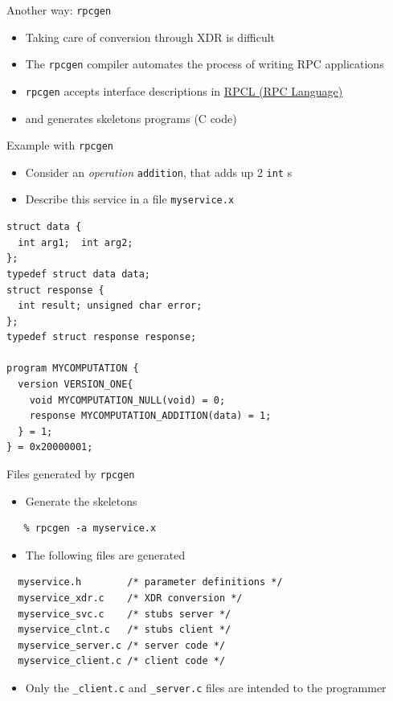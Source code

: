 \documentclass[bigger,hyperref={colorlinks=true, urlcolor=red, plainpages=false, pdfpagelabels, bookmarksnumbered}]{beamer}
\begin{document}
\begin{frame}[fragile,label=sec-2-15]{Another way: \texttt{rpcgen}}
 \begin{itemize}
\item Taking care of conversion through XDR is difficult
\item The \texttt{rpcgen} compiler automates the process of writing RPC applications
\item \texttt{rpcgen} accepts interface descriptions in \href{http://docs.oracle.com/cd/E19683-01/816-1435/6m7rrfn9k/index.html}{RPCL (RPC Language)}
\item and generates skeletons programs (C code)
\end{itemize}
\end{frame}

\begin{frame}[fragile,label=sec-2-16]{Example with \texttt{rpcgen}}
 \begin{itemize}
\item Consider an \emph{operation} \texttt{addition}, that adds up 2 \texttt{int} s
\item Describe this service in a file \texttt{myservice.x}
\end{itemize}
\lstset{language=C,label= ,caption= ,numbers=none}
\begin{lstlisting}
struct data {
  int arg1;  int arg2;
};
typedef struct data data;
struct response {
  int result; unsigned char error;
};
typedef struct response response;

program MYCOMPUTATION {
  version VERSION_ONE{
    void MYCOMPUTATION_NULL(void) = 0;
    response MYCOMPUTATION_ADDITION(data) = 1;
  } = 1;
} = 0x20000001;
\end{lstlisting}
\end{frame}

\begin{frame}[fragile,label=sec-2-17]{Files generated by \texttt{rpcgen}}
 \begin{itemize}
\item Generate the skeletons
\end{itemize}
\lstset{language=C,label= ,caption= ,numbers=none}
\begin{lstlisting}
   % rpcgen -a myservice.x
\end{lstlisting}
\begin{itemize}
\item The following files are generated
\end{itemize}
\lstset{language=C,label= ,caption= ,numbers=none}
\begin{lstlisting}
  myservice.h        /* parameter definitions */
  myservice_xdr.c    /* XDR conversion */
  myservice_svc.c    /* stubs server */   
  myservice_clnt.c   /* stubs client */
  myservice_server.c /* server code */
  myservice_client.c /* client code */
\end{lstlisting}
\begin{itemize}
\item Only the \texttt{\_client.c} and \texttt{\_server.c} files are intended to the programmer
\end{itemize}
\end{frame}
\end{document}
